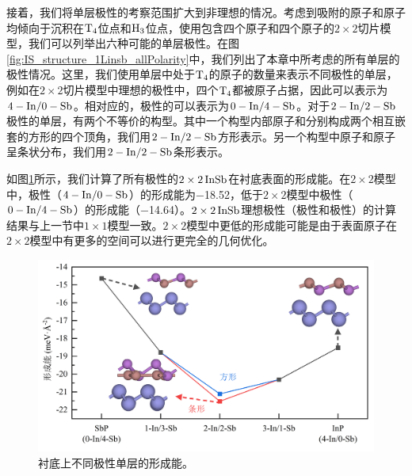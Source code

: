 接着，我们将单层极性的考察范围扩大到非理想的情况。考虑到吸附的原子和原子均倾向于沉积在$\rm T_{4} \it$位点和$\rm H_{3} \it$位点，使用包含四个原子和四个原子的$2 \times 2$切片模型，我们可以列举出六种可能的单层极性。在图\ref{fig:IS_structure_1Linsb_allPolarity}中，我们列出了本章中所考虑的所有单层的极性情况。这里，我们使用单层中处于$\rm T_{4} \it$的原子的数量来表示不同极性的单层，例如在$2 \times 2$切片模型中理想的极性中，四个$\rm T_{4} \it$都被原子占据，因此可以表示为$\rm 4-In/0-Sb$。相对应的，极性的可以表示为$\rm 0-In/4-Sb$。对于$\rm 2-In/2-Sb$极性的单层，有两个不等价的构型。其中一个构型内部原子和分别构成两个相互嵌套的方形的四个顶角，我们用$\rm 2-In/2-Sb$方形表示。另一个构型中原子和原子呈条状分布，我们用$\rm 2-In/2-Sb$条形表示。


如图\ref{fig:IS_DFT_1LInSb_all}所示，我们计算了所有极性的$2 \times 2 \cemb{InSb}$在衬底表面的形成能。在$2 \times 2$模型中，极性（$\rm 4-In/0-Sb$）的形成能为\SI{-18.52}{\mievpas}，低于$2 \times 2$模型中极性（$\rm 0-In/4-Sb$）的形成能（\SI{-14.64}{\mievpas}）。$2 \times 2 \cemb{InSb}$理想极性（极性和极性）的计算结果与上一节中$1 \times 1$模型一致。$2 \times 2$模型中更低的形成能可能是由于表面原子在$2 \times 2$模型中有更多的空间可以进行更完全的几何优化。


\begin{figure}[htb]
    \includegraphics{pic/IS_DFT_1LInSb_all.png}
    \caption{衬底上不同极性单层的形成能。}
    \label{fig:IS_DFT_1LInSb_all}
\end{figure}

